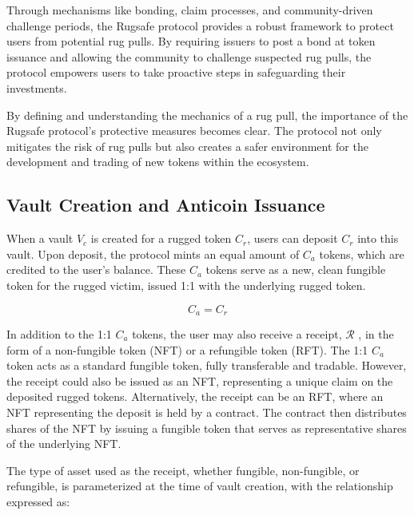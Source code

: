 \documentclass{article}
\begin{document}
Through mechanisms like bonding, claim processes, and community-driven challenge periods, the Rugsafe protocol provides a robust framework to protect users from potential rug pulls. By requiring issuers to post a bond at token issuance and allowing the community to challenge suspected rug pulls, the protocol empowers users to take proactive steps in safeguarding their investments.

By defining and understanding the mechanics of a rug pull, the importance of the Rugsafe protocol's protective measures becomes clear. The protocol not only mitigates the risk of rug pulls but also creates a safer environment for the development and trading of new tokens within the ecosystem.












\subsection{Vault Creation and Anticoin Issuance}
When a vault $V_c$ is created for a rugged token $C_r$, users can deposit $C_r$ into this vault. Upon deposit, the protocol mints an equal amount of $C_a$ tokens, which are credited to the user's balance. These $C_a$ tokens serve as a new, clean fungible token for the rugged victim, issued 1:1 with the underlying rugged token.

\begin{equation}
C_a = C_r
\end{equation}

In addition to the 1:1 $C_a$ tokens, the user may also receive a receipt, \(\mathcal{R} \) , in the form of a non-fungible token (NFT) or a refungible token (RFT). The 1:1 $C_a$ token acts as a standard fungible token, fully transferable and tradable. However, the receipt could also be issued as an NFT, representing a unique claim on the deposited rugged tokens. Alternatively, the receipt can be an RFT, where an NFT representing the deposit is held by a contract. The contract then distributes shares of the NFT by issuing a fungible token that serves as representative shares of the underlying NFT.

The type of asset used as the receipt, whether fungible, non-fungible, or refungible, is parameterized at the time of vault creation, with the relationship expressed as:
\end{document}
